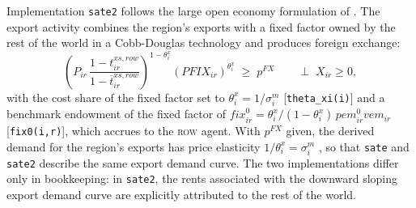 Implementation \texttt{sate2} follows the large open economy formulation of \citet{Schreiber2024}.
The export activity combines the region's exports with a fixed factor owned by the rest of the world in a Cobb-Douglas technology and produces foreign exchange:
\begin{equation}\label{zpXsate2}
\left(P_{ir}\,\frac{1-t^{xs,row}_{ir}}{1-\overline{t}^{xs,row}_{ir}}\right)^{1-\theta^{x}_{i}}
\left(\mathit{PFIX}_{ir}\right)^{\theta^{x}_{i}} \;\geq\; p^{FX}
\qquad \perp \; X_{ir}\geq 0,
\end{equation}
with the cost share of the fixed factor set to $\theta^x_i=1/\sigma^m_i$ [\texttt{theta\_xi(i)}] and a benchmark endowment of the fixed factor of $\textit{fix}^0_{ir}=\theta^x_i/(1-\theta^x_i)\,\textit{pem}^0_{ir}\textit{vem}_{ir}$ [\texttt{fix0(i,r)}], which accrues to the \textsc{row} agent.
With $p^{FX}$ given, the derived demand for the region's exports has price elasticity $1/\theta^x_i=\sigma^m_i$ \citep[Proposition 2]{Schreiber2024}, so that \texttt{sate} and \texttt{sate2} describe the same export demand curve.
The two implementations differ only in bookkeeping: in \texttt{sate2}, the rents associated with the downward sloping export demand curve are explicitly attributed to the rest of the world.

